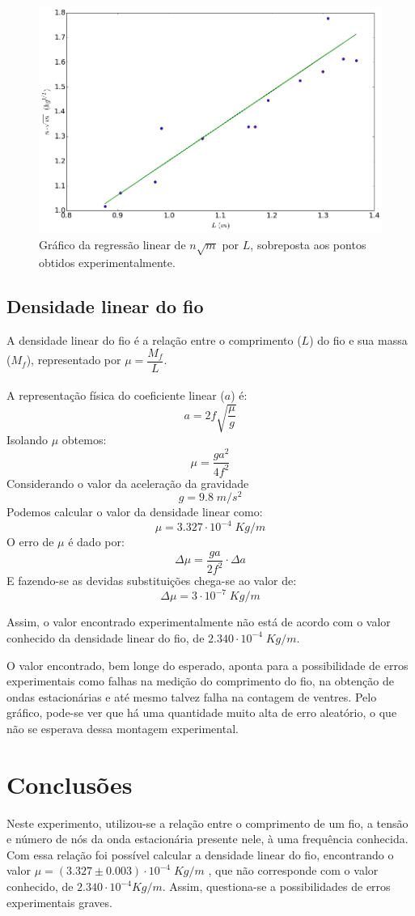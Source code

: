 \documentclass[12pt,a4paper]{article}
\begin{document}
\begin{figure} [!htbp]

\includegraphics[scale=0.6]{graf1.png}
\caption{Gráfico da regressão linear de $n\sqrt{m}$ por $L$, sobreposta aos pontos obtidos experimentalmente.}

\end{figure}
\subsection{Densidade linear do fio}
A densidade linear do fio é a relação entre o comprimento ($L$) do fio e sua massa ($M_f$), representado por $\mu = \dfrac{M_f}{L}$.\\\\
A representação física do coeficiente linear ($a$) é:
$$a = 2f \sqrt{\dfrac{\mu}{g}}$$
Isolando $\mu$ obtemos:
$$ \mu = \dfrac{ga^2}{4f^2} $$
Considerando o valor da aceleração da gravidade 
$$g = 9.8 \; m/s^2 $$
Podemos calcular o valor da densidade linear como:
$$ \mu = 3.327 \cdot 10^{-4} \; Kg/m$$
O erro de $\mu$ é dado por:
$$ \Delta \mu = \dfrac{ga}{2f^2} \cdot \Delta a$$
E fazendo-se as devidas substituições chega-se ao valor de:
$$\Delta \mu = 3 \cdot 10^{-7} \; Kg/m$$

Assim, o valor encontrado experimentalmente não está de acordo com o valor conhecido da densidade linear do fio, de $2.340 \cdot 10^{-4} \; Kg/m$.


O valor encontrado, bem longe do esperado, aponta para a possibilidade de erros experimentais como falhas na medição do comprimento do fio, na obtenção de ondas estacionárias e até mesmo talvez falha na contagem de ventres. Pelo gráfico, pode-se ver que há uma quantidade muito alta de erro aleatório, o que não se esperava dessa montagem experimental.


\section{Conclusões}

Neste experimento, utilizou-se a relação entre o comprimento de um fio, a tensão e número de nós da onda estacionária presente nele, à uma frequência conhecida. Com essa relação foi possível calcular a densidade linear do fio, encontrando o valor 
$ \mu = (3.327 \pm 0.003)  \cdot 10^{-4} \; Kg/m$ , que não corresponde com o valor conhecido, de $2.340 \cdot 10^{-4} Kg/m$. Assim, questiona-se a possibilidades de erros experimentais graves.
\end{document}
